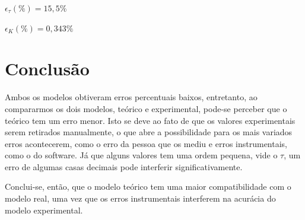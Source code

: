 \documentclass[12pt]{article}
\begin{document}
\begin{center}
     $\epsilon_{\tau}(\%) = 15,5 \%$
\end{center}

\begin{center}
     $\epsilon_{K}(\%)= 0,343\%$
\end{center}
\section{Conclusão}

\quad Ambos os modelos obtiveram erros percentuais baixos, entretanto, ao compararmos os dois modelos, teórico e experimental, pode-se perceber que o teórico tem um erro menor. Isto se deve ao fato de que os valores experimentais serem retirados manualmente, o que abre a possibilidade para os mais variados erros acontecerem, como o erro da pessoa que os mediu e erros instrumentais, como o do software. Já que alguns valores tem uma ordem pequena, vide o $\tau$, um erro de algumas casas decimais pode interferir significativamente.
\par Conclui-se, então, que o modelo teórico tem uma maior compatibilidade com o modelo real, uma vez que os erros instrumentais interferem na acurácia do modelo experimental.
\end{document}
